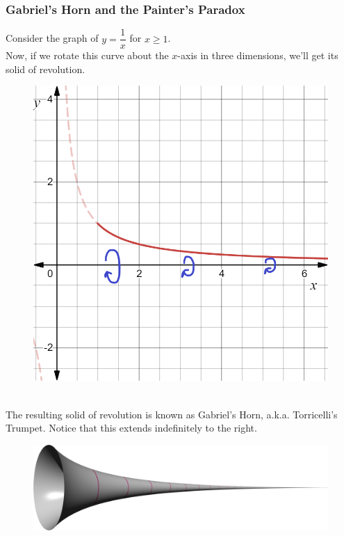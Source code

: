 \documentclass[14]{article}
\theoremstyle{definition}
\theoremstyle{case}
\begin{document}
\subsubsection{Gabriel's Horn and the Painter's Paradox}
Consider the graph of $y = \dfrac1{x}$ for $x \geq 1$.\\
Now, if we rotate this curve about the $x$-axis in three dimensions, we'll get its solid of revolution.\\
\begin{figure}[h]\centering
\includegraphics[scale=.3]{images/horn_2d}
\end{figure}\\
The resulting solid of revolution is known as Gabriel's Horn, a.k.a. Torricelli's Trumpet. Notice that this extends indefinitely to the right.
\begin{figure}[h]\centering
\includegraphics[scale=.1]{images/GabrielHorn}
\end{figure}\\
\end{document}

